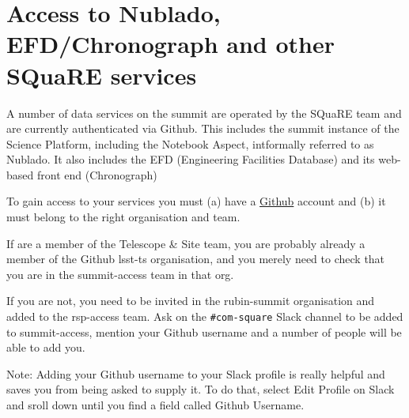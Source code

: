   




\newpage
\section{Access to Nublado, EFD/Chronograph and other SQuaRE services}
\label{sec:Nublado}

A number of data services on the summit are operated by the SQuaRE team and are currently authenticated via Github.
This includes the summit instance of the Science Platform, including the Notebook Aspect, intformally referred to as Nublado.
It also includes the EFD (Engineering Facilities Database) and its web-based front end (Chronograph)

To gain access to your services you must (a) have a \href{https://github.com}{Github} account and (b) it must belong to the right organisation and team.

If are a member of the Telescope \& Site team, you are probably already a member of the Github lsst-ts organisation, and you merely need to check that you are in the summit-access team in that org.

If you are not, you need to be invited in the rubin-summit organisation and added to the rsp-access team. Ask on the \verb|#com-square| Slack channel to be added to summit-access, mention your Github username and a number of people will be able to add you.

Note: Adding your Github username to your Slack profile is really helpful and saves you from being asked to supply it. To do that, select Edit Profile on Slack and sroll down until you find a field called Github Username.
